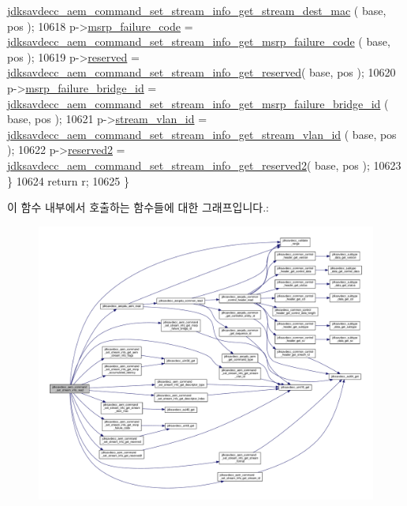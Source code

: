 \begin{DoxyCode}
      \hyperlink{group__command__set__stream__info_gaaa0c183cf50d8b2f3f785a61cd45180c}{jdksavdecc\_aem\_command\_set\_stream\_info\_get\_stream\_dest\_mac}
      ( base, pos );
10618         p->\hyperlink{structjdksavdecc__aem__command__set__stream__info_ad3d0b0a294bb35f39b361259730159d7}{msrp\_failure\_code} = 
      \hyperlink{group__command__set__stream__info_ga40f005401edeeb49e4ce00b9ba47cc9b}{jdksavdecc\_aem\_command\_set\_stream\_info\_get\_msrp\_failure\_code}
      ( base, pos );
10619         p->\hyperlink{structjdksavdecc__aem__command__set__stream__info_acb7bc06bed6f6408d719334fc41698c7}{reserved} = 
      \hyperlink{group__command__set__stream__info_gab949cdc2b67e61684f0467c249d541f2}{jdksavdecc\_aem\_command\_set\_stream\_info\_get\_reserved}( 
      base, pos );
10620         p->\hyperlink{structjdksavdecc__aem__command__set__stream__info_ad53a697054b76cf96ebb0d69a8cf8fb8}{msrp\_failure\_bridge\_id} = 
      \hyperlink{group__command__set__stream__info_ga672e0ad53bf3074052a9f9488ea327d7}{jdksavdecc\_aem\_command\_set\_stream\_info\_get\_msrp\_failure\_bridge\_id}
      ( base, pos );
10621         p->\hyperlink{structjdksavdecc__aem__command__set__stream__info_a8901fae0712dfce7341cdcbe8b43035c}{stream\_vlan\_id} = 
      \hyperlink{group__command__set__stream__info_gac0179bbd956d404db1995f395237a640}{jdksavdecc\_aem\_command\_set\_stream\_info\_get\_stream\_vlan\_id}
      ( base, pos );
10622         p->\hyperlink{structjdksavdecc__aem__command__set__stream__info_a0fc429b055e74830a4583ec37f5c3846}{reserved2} = 
      \hyperlink{group__command__set__stream__info_gae3b6666400123137edf1550ed0b1d539}{jdksavdecc\_aem\_command\_set\_stream\_info\_get\_reserved2}( 
      base, pos );
10623     \}
10624     \textcolor{keywordflow}{return} r;
10625 \}
\end{DoxyCode}


이 함수 내부에서 호출하는 함수들에 대한 그래프입니다.\+:
\nopagebreak
\begin{figure}[H]
\begin{center}
\leavevmode
\includegraphics[width=350pt]{group__command__set__stream__info_ga8295fbe9663536f6b26b3e815422a3f6_cgraph}
\end{center}
\end{figure}


